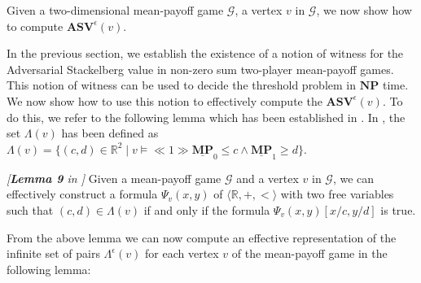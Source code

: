 Given a two-dimensional mean-payoff game $\mathcal{G}$, a vertex $v$ in $\mathcal{G}$, we now show how to compute $\mathbf{ASV}^{\epsilon}(v)$.

In the previous section, we establish the existence of a notion of witness for the Adversarial Stackelberg value in non-zero sum two-player mean-payoff games. This notion of witness can be used to decide the threshold problem in $\mathbf{NP}$ time. We now show how to use this notion to effectively compute the $\mathbf{ASV}^{\epsilon}(v)$. To do this, we refer to the following lemma which has been established in \cite{FGR20}. 
In \cite{FGR20}, the set $\Lambda(v)$ has been defined as $\Lambda(v) = \{(c,d) \in \mathbb{R}^2 \mid v \models \ll 1 \gg \underline{\mathbf{MP}}_0 \leqslant c \land \underline{\mathbf{MP}}_1 \geqslant d \}$.

\begin{lemma}
\label{LemPsiToThrOfReal}
 \emph{[\textbf{Lemma 9} in \cite{FGR20}]}
 Given a mean-payoff game $\mathcal{G}$ and a vertex $v$ in $\mathcal{G}$, we can effectively construct a formula $\Psi_v(x, y)$ of $\langle \mathbb{R}, +, < \rangle$ with two free variables such that $(c,d) \in \Lambda(v)$ if and only if the formula $\Psi_v(x, y)[x/c, y/d]$ is true.
\end{lemma}

From the above lemma we can now compute an effective representation of the infinite set of pairs $\Lambda^{\epsilon}(v)$ for each vertex $v$ of the mean-payoff game in the following lemma:

